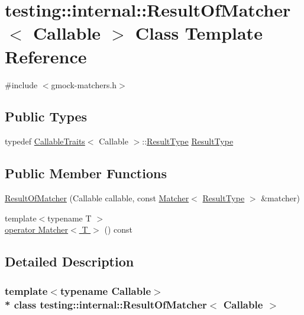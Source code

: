 \hypertarget{classtesting_1_1internal_1_1_result_of_matcher}{}\section{testing\+:\+:internal\+:\+:Result\+Of\+Matcher$<$ Callable $>$ Class Template Reference}
\label{classtesting_1_1internal_1_1_result_of_matcher}


{\ttfamily \#include $<$gmock-\/matchers.\+h$>$}

\subsection*{Public Types}
\begin{DoxyCompactItemize}
\item 
typedef \hyperlink{structtesting_1_1internal_1_1_callable_traits}{Callable\+Traits}$<$ Callable $>$\+::\hyperlink{classtesting_1_1internal_1_1_result_of_matcher_aa9db2267792fcae2cfa3f57683f4e048}{Result\+Type} \hyperlink{classtesting_1_1internal_1_1_result_of_matcher_aa9db2267792fcae2cfa3f57683f4e048}{Result\+Type}
\end{DoxyCompactItemize}
\subsection*{Public Member Functions}
\begin{DoxyCompactItemize}
\item 
\hyperlink{classtesting_1_1internal_1_1_result_of_matcher_a77c27bcc81ff133c1117a7edf84df0b9}{Result\+Of\+Matcher} (Callable callable, const \hyperlink{classtesting_1_1_matcher}{Matcher}$<$ \hyperlink{classtesting_1_1internal_1_1_result_of_matcher_aa9db2267792fcae2cfa3f57683f4e048}{Result\+Type} $>$ \&matcher)
\item 
{\footnotesize template$<$typename T $>$ }\\\hyperlink{classtesting_1_1internal_1_1_result_of_matcher_ad012b9d3c6dcb8eb755d63d5d2d95706}{operator Matcher$<$ T $>$} () const 
\end{DoxyCompactItemize}


\subsection{Detailed Description}
\subsubsection*{template$<$typename Callable$>$\\*
class testing\+::internal\+::\+Result\+Of\+Matcher$<$ Callable $>$}



